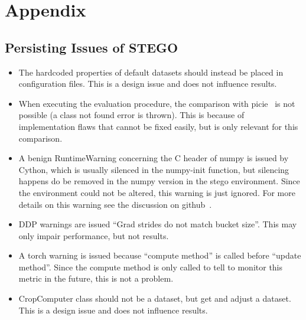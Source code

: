 \clearpage
\newpage
\appendix      %
\section*{Appendix}
\renewcommand\thesubsection{A.\Roman{subsection}}

\renewcommand\thefigure{A.\arabic{figure}}   
\renewcommand\thetable{A.\arabic{table}}
\renewcommand\thelstlisting{A.\arabic{lstlisting}} 
\setcounter{figure}{0}                        
\setcounter{table}{0}
\setcounter{lstlisting}{0} 

\subsection{Persisting Issues of STEGO}\label{subsec:stego-persisting-issued}
\begin{itemize}
    \item The hardcoded properties of default datasets should instead be placed in configuration files.
    This is a design issue and does not influence results.
    \item When executing the evaluation procedure, the comparison with \gls{picie}~\autocite{Cho2021} is not possible (a class not found error is thrown).
    This is because of implementation flaws that cannot be fixed easily, but is only relevant for this comparison.
    \item A benign RuntimeWarning concerning the C header of numpy is issued by Cython, which is usually silenced in the numpy-init function, but silencing happens do be removed in the numpy version in the \gls{stego} environment. Since the environment could not be altered, this warning is just ignored. For more details on this warning see the discussion on github~\autocite{rgommers2012}.
    \item DDP warnings are issued ``Grad strides do not match bucket size''.
    This may only impair performance, but not results.
    \item A torch warning is issued because ``compute method'' is called before ``update method''.
    Since the compute method is only called to tell \tensorboard{} to monitor this metric in the future, this is not a problem.
    \item CropComputer class should not be a dataset, but get and adjust a dataset.
    This is a design issue and does not influence results.
\end{itemize}

